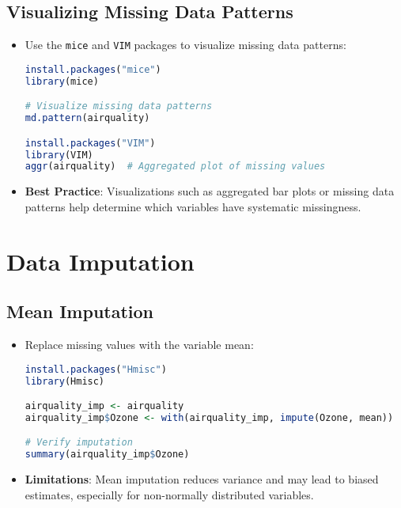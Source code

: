 \subsection{Visualizing Missing Data Patterns}
\begin{itemize}
    \item Use the \texttt{mice} and \texttt{VIM} packages to visualize missing data patterns:
\begin{lstlisting}[language=R]
install.packages("mice")
library(mice)

# Visualize missing data patterns
md.pattern(airquality)

install.packages("VIM")
library(VIM)
aggr(airquality)  # Aggregated plot of missing values
\end{lstlisting}

\item \textbf{Best Practice}: Visualizations such as aggregated bar plots or missing data patterns help determine which variables have systematic missingness.
\end{itemize}

\section{Data Imputation}
\subsection{Mean Imputation}
\begin{itemize}
    \item Replace missing values with the variable mean:
\begin{lstlisting}[language=R]
install.packages("Hmisc")
library(Hmisc)

airquality_imp <- airquality
airquality_imp$Ozone <- with(airquality_imp, impute(Ozone, mean))

# Verify imputation
summary(airquality_imp$Ozone)
\end{lstlisting}

\item \textbf{Limitations}: Mean imputation reduces variance and may lead to biased estimates, especially for non-normally distributed variables.
\end{itemize}

